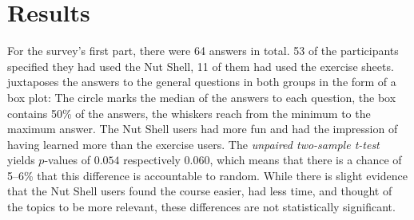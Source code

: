 \documentclass[paper=a4,abstract=on,cleardoublepage=empty,numbers=noenddot,toc=bib,12pt,appendixprefix=true]{scrreprt}
\begin{document}
\section{Results}

For the survey's first part, there were 64 answers in total. 53 of the participants specified they had used the Nut Shell, 11 of them had used the exercise sheets.  juxtaposes the answers to the general questions in both groups in the form of a box plot: The circle marks the median of the answers to each question, the box contains 50\% of the answers, the whiskers reach from the minimum to the maximum answer. The Nut Shell users had more fun and had the impression of having learned more than the exercise users. The \emph{unpaired two-sample t-test} \cite{student08} yields $p$-values of $0.054$ respectively $0.060$, which means that there is a chance of 5--6\% that this difference is accountable to random. While there is slight evidence that the Nut Shell users found the course easier, had less time, and thought of the topics to be more relevant, these differences are not statistically significant.
\end{document}
